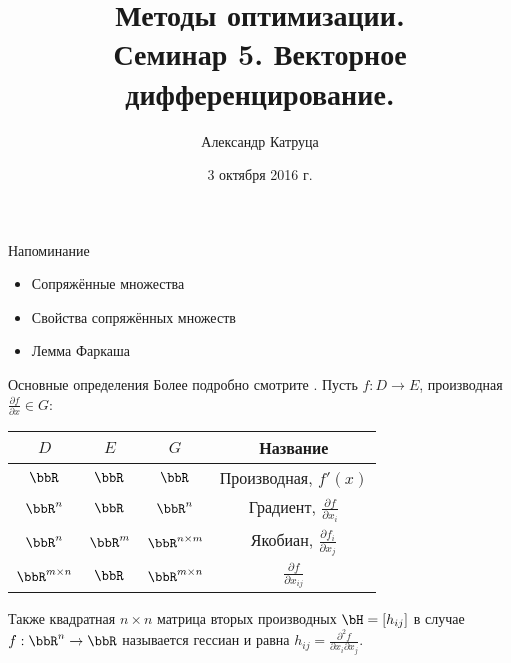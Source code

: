 \documentclass[12pt,russian]{beamer}
\title[Семинар 5]{Методы оптимизации. \\
 Семинар 5. Векторное дифференцирование.}
\author{Александр Катруца}
\institute{Московский физико-технический институт,\\
Факультет Управления и Прикладной Математики}
\date{3 октября 2016 г.}
\begin{document}
\begin{frame}
\maketitle
\end{frame}

\begin{frame}{Напоминание}
\begin{itemize}
\item Сопряжённые множества
\item Свойства сопряжённых множеств
\item Лемма Фаркаша
\end{itemize}
\end{frame}

\begin{frame}{Основные определения}
Более подробно смотрите \href{https://en.wikipedia.org/wiki/Matrix_calculus}{}.
Пусть $f: D \rightarrow E$, производная $\frac{\partial f}{\partial x} \in G$:
\begin{table}[!h]
\centering
\begin{tabular}{|c|c|c|c|}
\hline
$D$ & $E$ & $G$ & Название\\
\hline
$\bbR$ & $\bbR$ & $\bbR$ & Производная, $f'(x)$\\
\hline
$\bbR^n$ & $\bbR$ & $\bbR^n$ & Градиент, $\frac{\partial f}{\partial x_i}$\\
\hline
$\bbR^n$ & $\bbR^m$ & $\bbR^{n \times m}$ & Якобиан, $\frac{\partial f_i}{\partial x_j}$ \\
\hline
$\bbR^{m \times n}$ & $\bbR$ & $\bbR^{m \times n}$ & $\frac{\partial f}{\partial x_{ij}}$\\
\hline
\end{tabular}
\end{table}

Также квадратная $n \times n$ матрица вторых производных $\bH = [h_{ij}]$ в случае $f: \bbR^n \rightarrow \bbR$ называется гессиан и равна $h_{ij} = \frac{\partial^2 f}{\partial x_i \partial x_j}$.
\end{frame}
\end{document}
